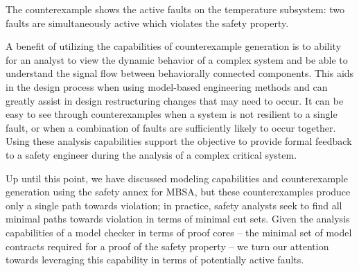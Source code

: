 The counterexample shows the active faults on the temperature subsystem: two faults are simultaneously active which violates the safety property. 

A benefit of utilizing the capabilities of counterexample generation is to ability for an analyst to view the dynamic behavior of a complex system and be able to understand the signal flow between behaviorally connected components. This aids in the design process when using model-based engineering methods and can greatly assist in design restructuring changes that may need to occur. It can be easy to see through counterexamples when a system is not resilient to a single fault, or when a combination of faults are sufficiently likely to occur together. Using these analysis capabilities support the objective to provide formal feedback to a safety engineer during the analysis of a complex critical system.

Up until this point, we have discussed modeling capabilities and counterexample generation using the safety annex for MBSA, but these counterexamples produce only a single path towards violation; in practice, safety analysts seek to find all minimal paths towards violation in terms of minimal cut sets. Given the analysis capabilities of a model checker in terms of proof cores -- the minimal set of model contracts required for a proof of the safety property -- we turn our attention towards leveraging this capability in terms of potentially active faults. 